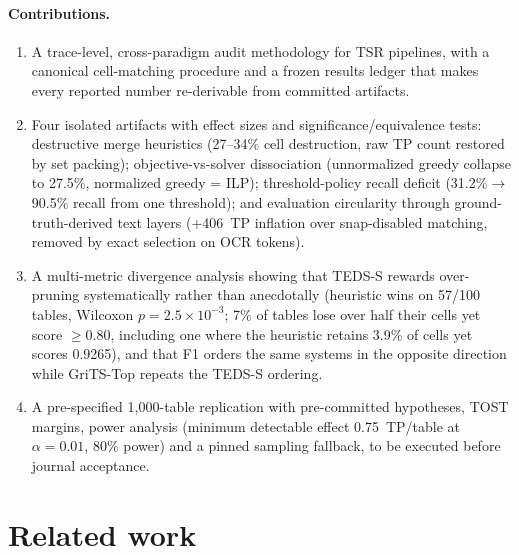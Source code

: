 \documentclass[final,5p,times,twocolumn]{elsarticle}
\begin{document}
\paragraph{Contributions.}
\begin{enumerate}
\item A trace-level, cross-paradigm audit methodology for TSR pipelines, with a
      canonical cell-matching procedure and a frozen results ledger that makes
      every reported number re-derivable from committed artifacts.
\item Four isolated artifacts with effect sizes and significance/equivalence
      tests: destructive merge heuristics (27--34\% cell destruction, raw TP
      count restored by set packing); objective-vs-solver dissociation (unnormalized
      greedy collapse to 27.5\%, normalized greedy = ILP); threshold-policy
      recall deficit (31.2\%$\to$90.5\% recall from one threshold); and
      evaluation circularity through ground-truth-derived text layers
      (+406~TP inflation over snap-disabled matching, removed by exact
      selection on OCR tokens).
\item A multi-metric divergence analysis showing that TEDS-S rewards
      over-pruning systematically rather than anecdotally (heuristic wins on
      57/100 tables, Wilcoxon $p = 2.5\times 10^{-3}$; 7\% of tables lose
      over half their cells yet score $\geq 0.80$, including one where the
      heuristic retains 3.9\% of cells yet scores 0.9265), and that
      F1 orders the same systems in the opposite direction while
      GriTS-Top repeats the TEDS-S ordering.
\item A pre-specified 1{,}000-table replication with pre-committed
      hypotheses, TOST margins, power analysis (minimum detectable effect
      0.75~TP/table at $\alpha{=}0.01$, 80\% power) and a pinned sampling
      fallback, to be executed before journal acceptance.
\end{enumerate}

\section{Related work}\label{sec:related}
\end{document}
